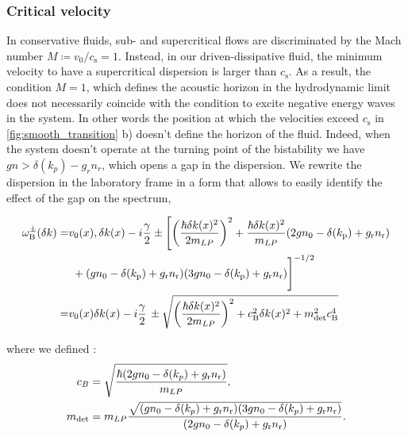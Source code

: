 \subsubsection{Critical velocity} In conservative fluids, sub- and supercritical flows are discriminated by the Mach number $M\coloneqq v_0/c_\mathrm{s}=1$.
Instead, in our driven-dissipative fluid, the minimum velocity to have a supercritical dispersion is larger than $c_\mathrm{s}$.
As a result, the condition $M=1$, which defines the acoustic horizon in the hydrodynamic limit does not necessarily coincide with the condition to excite negative energy waves in the system. In other words the position at 
which the velocities exceed $c_\mathrm{s}$ in \autoref{fig:smooth_transition} b) doesn't define the horizon of the fluid. Indeed, when the system doesn't operate at the turning
point of the bistability we have $gn>\delta(k_p)-g_rn_r$, which opens a gap in the dispersion. We rewrite the dispersion in the laboratory frame in a form that allows to easily identify the effect of the gap on the spectrum,


\begin{align}\label{eq:lfbogom}
    \omega^\pm_\mathrm{B}(\delta k)=&v_0(x) ,\delta k(x)-i\frac{\gamma}{2}\nonumber\pm\Biggl[\left(\frac{\hbar\delta k(x)^2}{2 m_{LP}}\right)^2+\frac{\hbar \delta k(x)^2}{m_{LP}}(2g n_0 - \delta(k_\mathrm{p})+g_\mathrm{r}n_\mathrm{r})\\
    &\,\,+(g n_0 - \delta(k_\mathrm{p})+g_\mathrm{r}n_\mathrm{r})(3 g n_0 - \delta(k_\mathrm{p})+g_\mathrm{r}n_\mathrm{r})\Biggr]^{-1/2}\nonumber\\
    =&v_0(x) \delta k(x)-i\frac{\gamma}{2}\,\pm\sqrt{\left(\frac{\hbar\delta k(x)^2}{2 m_{LP}}\right)^2+c_\mathrm{B}^2\delta k(x)^2+m_{\mathrm{det}}^2c_\mathrm{B}^4}
\end{align}

where we defined :
\begin{subequations}
    \label{eq:m_bog}
    \begin{align}
    c_B & = \sqrt{\dfrac{\hbar(2gn_0- \delta(k_p)+g_\mathrm{r}n_\mathrm{r})}{m_{LP}}},\\
    m_{\mathrm{det}}&=m_{LP}\dfrac{\sqrt{(gn_0- \delta(k_p)+g_\mathrm{r}n_\mathrm{r})(3gn_0- \delta(k_p)+g_\mathrm{r}n_\mathrm{r})}}{(2gn_0- \delta(k_p)+g_\mathrm{r}n_\mathrm{r})}.
    \end{align}
\end{subequations}

